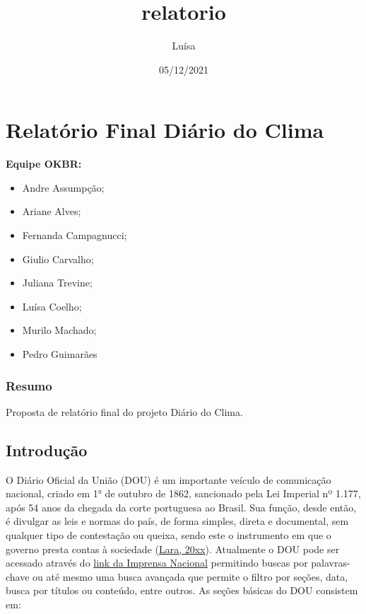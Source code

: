 \documentclass[
]{article}
\title{relatorio}
\author{Luísa}
\date{05/12/2021}
\providecommand{\tightlist}{%
  \setlength{\itemsep}{0pt}\setlength{\parskip}{0pt}}
\begin{document}
\maketitle

\hypertarget{relatuxf3rio-final-diuxe1rio-do-clima}{%
\section{Relatório Final Diário do
Clima}\label{relatuxf3rio-final-diuxe1rio-do-clima}}

\textbf{Equipe OKBR:}

\begin{itemize}
\tightlist
\item
  Andre Assumpção;
\item
  Ariane Alves;
\item
  Fernanda Campagnucci;
\item
  Giulio Carvalho;
\item
  Juliana Trevine;
\item
  Luísa Coelho;
\item
  Murilo Machado;
\item
  Pedro Guimarães
\end{itemize}

\hypertarget{resumo}{%
\subsubsection{Resumo}\label{resumo}}

Proposta de relatório final do projeto Diário do Clima.

\hypertarget{introduuxe7uxe3o}{%
\subsection{Introdução}\label{introduuxe7uxe3o}}

O Diário Oficial da União (DOU) é um importante veículo de comunicação
nacional, criado em 1° de outubro de 1862, sancionado pela Lei Imperial
nº 1.177, após 54 anos da chegada da corte portuguesa ao Brasil. Sua
função, desde então, é divulgar as leis e normas do país, de forma
simples, direta e documental, sem qualquer tipo de contestação ou
queixa, sendo este o instrumento em que o governo presta contas à
sociedade (\href{link}{Lara, 20xx}). Atualmente o DOU pode ser acessado
através do \href{https://www.gov.br/imprensanacional/pt-br}{link da
Imprensa Nacional} permitindo buscas por palavras-chave ou até mesmo uma
busca avançada que permite o filtro por seções, data, busca por títulos
ou conteúdo, entre outros. As seções básicas do DOU consistem em:
\end{document}
